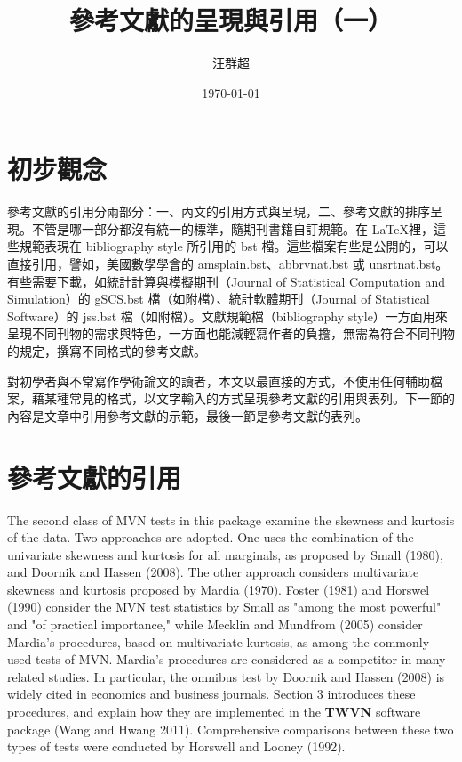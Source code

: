\title{ {\MB 參考文獻的呈現與引用（一）}}		%
\author{{\SM 汪群超}}						%
\date{{\TT \today }} 							 

\maketitle
\fontsize{12}{22pt}\selectfont 
\section{初步觀念}
參考文獻的引用分兩部分：一、內文的引用方式與呈現，二、參考文獻的排序呈現。不管是哪一部分都沒有統一的標準，隨期刊書籍自訂規範。在   \LaTeX 裡，這些規範表現在 bibliography style 所引用的 bst 檔。這些檔案有些是公開的，可以直接引用，譬如，美國數學學會的 amsplain.bst、abbrvnat.bst 或 unsrtnat.bst。有些需要下載，如統計計算與模擬期刊（Journal of Statistical Computation and Simulation）的 gSCS.bst 檔（如附檔）、統計軟體期刊（Journal of Statistical Software）的 jss.bst 檔（如附檔）。文獻規範檔（bibliography style）一方面用來呈現不同刊物的需求與特色，一方面也能減輕寫作者的負擔，無需為符合不同刊物的規定，撰寫不同格式的參考文獻。

對初學者與不常寫作學術論文的讀者，本文以最直接的方式，不使用任何輔助檔案，藉某種常見的格式，以文字輸入的方式呈現參考文獻的引用與表列。下一節的內容是文章中引用參考文獻的示範，最後一節是參考文獻的表列。

\section{參考文獻的引用}
The second class of MVN tests in this package examine the skewness and kurtosis of the data. Two approaches are adopted. One uses the combination of the univariate skewness and kurtosis for all marginals, as proposed by Small (1980), and Doornik and Hassen (2008). The other approach considers multivariate skewness and kurtosis proposed by Mardia (1970).   Foster (1981) and Horswel (1990) consider the MVN test statistics by Small as "among the most powerful" and "of practical importance,"  while  Mecklin and Mundfrom (2005) consider Mardia's procedures, based on multivariate kurtosis, as among the commonly used tests of MVN.  Mardia's procedures are considered as a competitor  in many related studies.
In particular, the omnibus test by  Doornik and Hassen (2008) is widely cited in economics and business journals. Section 3 introduces these procedures, and explain how they are implemented in the \textbf{TWVN} software package (Wang and Hwang 2011). Comprehensive  comparisons between these two types of tests were conducted by Horswell and Looney (1992).

